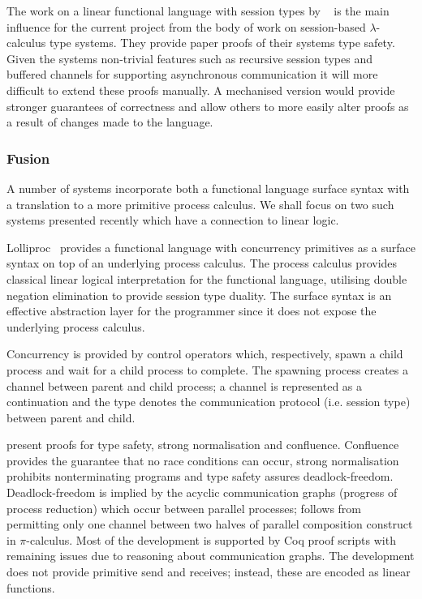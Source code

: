 \documentclass{mprop}
\newcommand{\1}{\textbf{1}\xspace}
\begin{document}
The work on a linear functional language with session types by \citeauthor{Gay:2010:LAST}~\cite{Gay:2010:LAST} is the main influence for the current project from the body of work on session-based $\lambda$-calculus type systems. They provide paper proofs of their systems type safety. Given the systems non-trivial features such as recursive session types and buffered channels for supporting asynchronous communication it will more difficult to extend these proofs manually. A mechanised version would provide stronger guarantees of correctness and allow others to more easily alter proofs as a result of changes made to the language.

\subsubsection{Fusion}

A number of systems incorporate both a functional language surface syntax with a translation to a more primitive process calculus. We shall focus on two such systems presented recently which have a connection to linear logic.

Lolliproc~\cite{Mazurak:2010:LCC} provides a functional language with concurrency primitives as a surface syntax on top of an underlying process calculus. The process calculus provides classical linear logical interpretation for the functional language, utilising double negation elimination to provide session type duality. The surface syntax is an effective abstraction layer for the programmer since it does not expose the underlying process calculus.

Concurrency is provided by control operators which, respectively, spawn a child process and wait for a child process to complete. The spawning process creates a channel between parent and child process; a channel is represented as a continuation and the type denotes the communication protocol (i.e. session type) between parent and child.

\citeauthor{Mazurak:2010:LCC} present proofs for type safety, strong normalisation and confluence. Confluence provides the guarantee that no race conditions can occur, strong normalisation prohibits nonterminating programs and type safety assures deadlock-freedom. Deadlock-freedom is implied by the acyclic communication graphs (progress of process reduction) which occur between parallel processes; follows from permitting only one channel between two halves of parallel composition construct in $\pi$-calculus. Most of the development is supported by Coq proof scripts with remaining issues due to reasoning about communication graphs. The development does not provide primitive send and receives; instead, these are encoded as linear functions. 
\end{document}
